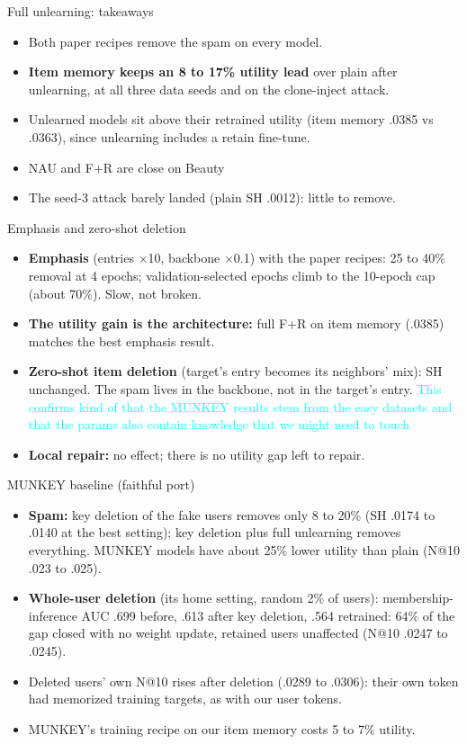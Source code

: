 \documentclass{beamer}
\newcommand{\pierre}[1]{\textcolor{cyan}{#1}}
\begin{document}
\begin{frame}{Full unlearning: takeaways}
\begin{itemize}
  \item Both paper recipes remove the spam on every model.
  \item \textbf{Item memory keeps an 8 to 17\% utility lead} over plain after
        unlearning, at all three data seeds and on the clone-inject attack.
  \item Unlearned models sit above their retrained utility (item memory .0385
        vs .0363), since unlearning includes a retain fine-tune.
  \item NAU and F+R are close on Beauty
  \item The seed-3 attack barely landed (plain SH .0012): little to remove.
\end{itemize}
\end{frame}

\begin{frame}{Emphasis and zero-shot deletion}
\begin{itemize}
  \item \textbf{Emphasis} (entries $\times$10, backbone $\times$0.1) with the
        paper recipes: 25 to 40\% removal at 4 epochs; validation-selected
        epochs climb to the 10-epoch cap (about 70\%). Slow, not broken.
  \item \textbf{The utility gain is the architecture:} full F+R on item memory
        (.0385) matches the best emphasis result.
  \item \textbf{Zero-shot item deletion} (target's entry becomes its neighbors'
        mix): SH unchanged. The spam lives in the backbone, not in the target's
        entry. \pierre{This confirms kind of that the MUNKEY results stem from the easy datasets and that the params also contain knowledge that we might need to touch}
  \item \textbf{Local repair:} no effect; there is no utility gap left to repair.
\end{itemize}
\end{frame}

\begin{frame}{MUNKEY baseline (faithful port)}
\begin{itemize}
  \item \textbf{Spam:} key deletion of the fake users removes only 8 to 20\%
        (SH .0174 to .0140 at the best setting); key deletion plus full
        unlearning removes everything. MUNKEY models have about 25\% lower
        utility than plain (N@10 .023 to .025).
  \item \textbf{Whole-user deletion} (its home setting, random 2\% of users):
        membership-inference AUC .699 before, .613 after key deletion, .564
        retrained: 64\% of the gap closed with no weight update, retained users
        unaffected (N@10 .0247 to .0245).
  \item Deleted users' own N@10 rises after deletion (.0289 to .0306): their own
        token had memorized training targets, as with our user tokens.
  \item MUNKEY's training recipe on our item memory costs 5 to 7\% utility.
\end{itemize}
\end{frame}
\end{document}
